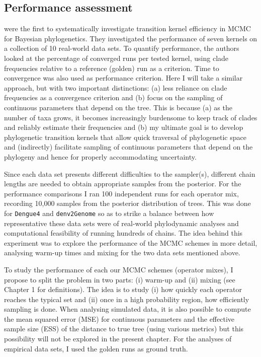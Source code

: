 \subsection{Performance assessment}
\label{sec:performance_methods}

\cite{Lakner2008} were the first to systematically investigate transition kernel efficiency in MCMC for Bayesian phylogenetics.
They investigated the performance of seven kernels on a collection of 10 real-world data sets.
To quantify performance, the authors looked at the percentage of converged runs per tested kernel, using clade frequencies relative to a reference (golden) run as a criterion.
Time to convergence was also used as performance criterion.
Here I will take a similar approach, but with two important distinctions: (a) less reliance on clade frequencies as a convergence criterion and (b) focus on the sampling of continuous parameters that depend on the tree.
This is because (a) as the number of taxa grows, it becomes increasingly burdensome to keep track of clades and reliably estimate their frequencies and (b) my ultimate goal is to develop phylogenetic transition kernels that allow quick traversal of phylogenetic space and (indirectly) facilitate sampling of continuous parameters that depend on the phylogeny and hence for properly accommodating uncertainty.

Since each data set presents different difficulties to the sampler(s), different chain lengths are needed to obtain appropriate samples from the posterior.
For the performance comparisons I ran 100 independent runs for each operator mix, recording 10,000 samples from the posterior distribution of trees.
This was done for \verb|Dengue4| and \verb|denv2Genome| so as to strike a balance between how representative these data sets were of real-world phylodynamic analyses and computational feasibility of running hundreds of chains.
The idea behind this experiment was to explore the performance of the MCMC schemes in more detail, analysing warm-up times and mixing for the two data sets mentioned above.

To study the performance of each our MCMC schemes (operator mixes), I propose to split the problem in two parts: (i) warm-up and (ii) mixing (see Chapter 1 for definitions).
The idea is to study (i) how quickly each operator reaches the typical set and (ii) once in a high probability region, how efficiently sampling is done.
When analysing simulated data, it is also possible to compute the mean squared error (MSE) for continuous parameters and the effective sample size (ESS) of the  distance to true tree (using various metrics) but this possibility will not be explored in the present chapter.
For the analyses of empirical data sets, I used the golden runs as ground truth.

